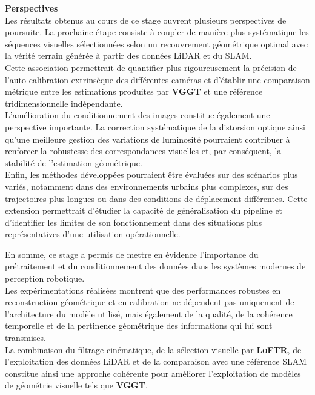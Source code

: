 \documentclass[12pt,a4paper,oneside]{report}
\begin{document}
\par\bigskip
\par\bigskip

\hspace*{0.4cm}\textbf{Perspectives}\\

\hspace*{.3cm}Les résultats obtenus au cours de ce stage ouvrent plusieurs perspectives de poursuite. La prochaine étape consiste à coupler de manière plus systématique les séquences visuelles sélectionnées selon un recouvrement géométrique optimal avec la vérité terrain générée à partir des données LiDAR et du SLAM.\\
Cette association permettrait de quantifier plus rigoureusement la précision de l'auto-calibration extrinsèque des différentes caméras et d'établir une comparaison métrique entre les estimations produites par \textbf{VGGT} et une référence tridimensionnelle indépendante.\\

\hspace*{.3cm}L'amélioration du conditionnement des images constitue également une perspective importante. La correction systématique de la distorsion optique ainsi qu'une meilleure gestion des variations de luminosité pourraient contribuer à renforcer la robustesse des correspondances visuelles et, par conséquent, la stabilité de l'estimation géométrique.\\
\hspace*{.5cm}Enfin, les méthodes développées pourraient être évaluées sur des scénarios plus variés, notamment dans des environnements urbains plus complexes, sur des trajectoires plus longues ou dans des conditions de déplacement différentes. Cette extension permettrait d'étudier la capacité de généralisation du pipeline et d'identifier les limites de son fonctionnement dans des situations plus représentatives d'une utilisation opérationnelle.

\par\bigskip

\hspace*{.3cm}En somme, ce stage a permis de mettre en évidence l'importance du prétraitement et du conditionnement des données dans les systèmes modernes de perception robotique.\\

\hspace*{.3cm}Les expérimentations réalisées montrent que des performances robustes en reconstruction géométrique et en calibration ne dépendent pas uniquement de l'architecture du modèle utilisé, mais également de la qualité, de la cohérence temporelle et de la pertinence géométrique des informations qui lui sont transmises.\\
\hspace*{.3cm}La combinaison du filtrage cinématique, de la sélection visuelle par \textbf{LoFTR}, de l'exploitation des données LiDAR et de la comparaison avec une référence SLAM constitue ainsi une approche cohérente pour améliorer l'exploitation de modèles de géométrie visuelle tels que \textbf{VGGT}.\\
\end{document}
